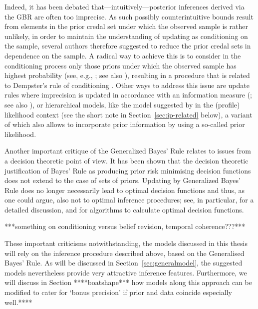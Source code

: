 Indeed, it has been debated that---intuitively---posterior inferences derived via the GBR are often too imprecise.
As such possibly counterintuitive bounds result from elements in the prior credal set under which the observed sample is rather unlikely,
in order to maintain the understanding of updating as conditioning on the sample,
several authors therefore suggested to reduce the prior credal sets in dependence on the sample.
A radical way to achieve this is to consider in the conditioning process only those priors
under which the observed sample has highest probability (see, e.g., \cite{2007:held}; see also \cite{1982:walley}),
resulting in a procedure that is related to Dempster's rule of conditioning \parencite[see, e.g.,][\S 3.2]{itip-other}.
Other ways to address this issue are update rules where imprecision is updated in accordance with an information measure 
(\cite{1993:coolen, 1994:coolen}; see also \cite{1994:coolen::phd}), or hierarchical models,
like the model suggested by \textcite{2008:cattaneo} in the (profile) likelihood context
(see the short note in Section~\ref{sec:ip-related} below),
a variant of which also allows to incorporate prior information by using a so-called prior likelihood.

Another important critique of the Generalized Bayes' Rule relates to issues from a decision theoretic point of view.
It has been shown that the decision theoretic justification of Bayes' Rule
as producing prior risk minimising decision functions does not extend to the case of sets of priors.
Updating by Generalized Bayes' Rule does no longer necessarily lead to optimal decision functions and thus, as one could argue,
also not to optimal inference procedures; see, in particular, \textcite{2003:augustin} for a detailed discussion, 
\textcite{2001:NoubiapSeidel} and \textcite{Augustin5:2004} for algorithms to calculate optimal decision functions.

***something on conditioning versus belief revision, temporal coherence???***

These important criticisms notwithstanding, 
the models discussed in this thesis will rely on the inference procedure described above, based on the Generalised Bayes' Rule.
As will be discussed in Section~\ref{sec:generalmodel},
the suggested models nevertheless provide very attractive inference features.
Furthermore, we will discuss in Section ****boatshape***
how models along this approach can be modified to cater for `bonus precision'
if prior and data coincide especially well.****


